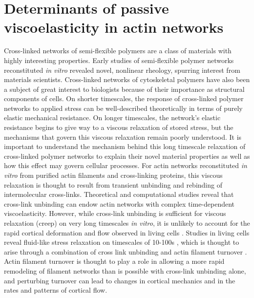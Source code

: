 \section{Determinants of passive viscoelasticity in actin networks}
Cross-linked networks of semi-flexible polymers are a class of materials with highly interesting properties. Early studies of semi-flexible polymer networks reconstituted {\em in vitro} revealed novel, nonlinear rheology, spurring interest from materials scientists\cite{megareview}.  Cross-linked networks of cytoskeletal polymers have also been a subject of great interest to biologists because of their importance as structural components of cells\cite{cellmech_review1,cellmech_review2}.  On shorter timescales, the response of cross-linked polymer networks to applied stress can be well-described theoretically in terms of purely elastic mechanical resistance.  On longer timescales, the network's elastic resistance begins to give way to a viscous relaxation of stored stress, but the mechanisms that govern this viscous relaxation remain poorly understood.   It is important to understand the mechanism behind this long timescale relaxation of cross-linked polymer networks to explain their novel material properties as well as how this effect may govern cellular processes\cite{cell_rheo}.  For actin networks reconstituted  {\em in vitro} from purified actin filaments and cross-linking proteins, this viscous relaxation is thought to result from transient unbinding and rebinding of intermolecular cross-links\cite{rheo_crosslinksmatter,theo_crosslinkslip1}. Theoretical \cite{theo_crosslinkslip1,theo_crosslinkslip2} and computational \cite{model_taeyoon,rheo_crosslinkslip2,theo_crosslinkslip3} studies reveal that cross-link unbinding can endow actin networks with complex time-dependent viscoelasticity. However, while cross-link unbinding is sufficient for viscous relaxation (creep) on very long timescales {\em in vitro}, it is unlikely to account for the rapid cortical deformation and flow observed in living cells \cite{rheo_crosslinksmatter, rheo_crosslinkslip1, rheo_crosslinkslip2, rheo_crosslinkslip3, rheo_nonaffine}.  Studies in living cells reveal fluid-like stress relaxation on timescales of 10-100s \cite{cellmech_flows, cellmech_flows2, cellmech_flows3, rheo_fluid, rheo_fluid2, cell_rheo_exp}, which is thought to arise through a combination of cross link unbinding and actin filament turnover \cite{De-La-Cruz:2015aa, De-La-Cruz:2009aa, Salbreux2012536}. Actin filament turnover is thought to play a role in allowing a more rapid remodeling of filament networks than is possible with cross-link unbinding alone\cite{Robin:2014aa}, and perturbing turnover can lead to changes in cortical mechanics and in the rates and patterns of cortical flow\cite{Van-Goor:2012aa, Fritzschee1501337}.    

